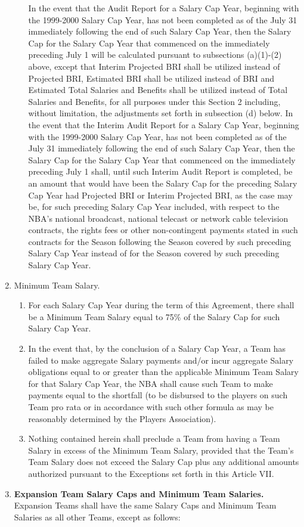 \documentclass[
]{book}
\providecommand{\tightlist}{%
  \setlength{\itemsep}{0pt}\setlength{\parskip}{0pt}}
\begin{document}
\begin{enumerate}
\begin{enumerate}
    In the event that the Audit Report for a Salary Cap Year, beginning with the 1999-2000 Salary Cap Year, has not been completed as of the July 31 immediately following the end of such Salary Cap Year, then the Salary Cap for the Salary Cap Year that commenced on the immediately preceding July 1 will be calculated pursuant to subsections (a)(1)-(2) above, except that Interim Projected BRI shall be utilized instead of Projected BRI, Estimated BRI shall be utilized instead of BRI and Estimated Total Salaries and Benefits shall be utilized instead of Total Salaries and Benefits, for all purposes under this Section 2 including, without limitation, the adjustments set forth in subsection (d) below. In the event that the Interim Audit Report for a Salary Cap Year, beginning with the 1999-2000 Salary Cap Year, has not been completed as of the July 31 immediately following the end of such Salary Cap Year, then the Salary Cap for the Salary Cap Year that commenced on the immediately preceding July 1 shall, until such Interim Audit Report is completed, be an amount that would have been the Salary Cap for the preceding Salary Cap Year had Projected BRI or Interim Projected BRI, as the case may be, for such preceding Salary Cap Year included, with respect to the NBA's national broadcast, national telecast or network cable television contracts, the rights fees or other non-contingent payments stated in such contracts for the Season following the Season covered by such preceding Salary Cap Year instead of for the Season covered by such preceding Salary Cap Year.
  \end{enumerate}
\item
  Minimum Team Salary.

  \begin{enumerate}
  \def\labelenumii{(\arabic{enumii})}
  \tightlist
  \item
    For each Salary Cap Year during the term of this Agreement, there shall be a Minimum Team Salary equal to 75\% of the Salary Cap for such Salary Cap Year.
  \item
    In the event that, by the conclusion of a Salary Cap Year, a Team has failed to make aggregate Salary payments and/or incur aggregate Salary obligations equal to or greater than the applicable Minimum Team Salary for that Salary Cap Year, the NBA shall cause such Team to make payments equal to the shortfall (to be disbursed to the players on such Team pro rata or in accordance with such other formula as may be reasonably determined by the Players Association).
  \item
    Nothing contained herein shall preclude a Team from having a Team Salary in excess of the Minimum Team Salary, provided that the Team's Team Salary does not exceed the Salary Cap plus any additional amounts authorized pursuant to the Exceptions set forth in this Article VII.
  \end{enumerate}
\item
  \textbf{Expansion Team Salary Caps and Minimum Team Salaries.} Expansion Teams shall have the same Salary Caps and Minimum Team Salaries as all other Teams, except as follows:


\end{enumerate}
\end{document}
